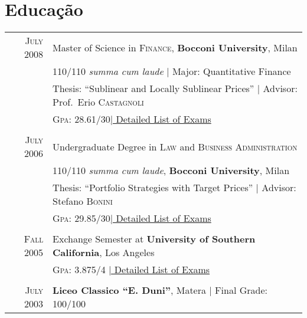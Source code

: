 \documentclass[a4paper,10pt]{article}
\begin{document}
\section{Educação}
\begin{tabular}{rl}	

  \textsc{July} 2008  & Master of Science in \textsc{Finance}, \textbf{Bocconi University}, Milan\\
                      & 110/110 \small\emph{summa cum laude} | Major: Quantitative Finance\\
                      & Thesis: ``Sublinear and Locally Sublinear Prices'' | \small Advisor: Prof.~Erio \textsc{Castagnoli}\\
                      &\normalsize \textsc{Gpa}: 28.61/30\hyperlink{grds}{\hfill | \footnotesize Detailed List of Exams}\\
                      
                      &\\

  \textsc{July} 2006  & Undergraduate Degree in \textsc{Law} and \textsc{Business Administration} \\
                      & 110/110 \small\emph{summa cum laude}, \normalsize\textbf{Bocconi University}, Milan\\
                      & Thesis: ``Portfolio Strategies with Target Prices'' | \small Advisor: Stefano \textsc{Bonini}\\
                      & \normalsize \textsc{Gpa}: 29.85/30\hyperlink{grds_cleli}{\hfill| \footnotesize Detailed List of Exams}\\
                      
                      &\\

  \textsc{Fall} 2005  & Exchange Semester at \textbf{University of Southern California}, Los Angeles\\
                      & \textsc{Gpa}: 3.875/4 \hyperlink{grds_usc}{\hfill| \footnotesize Detailed List of Exams}\\
                      
                      &\\

  \textsc{July} 2003  & \textbf{Liceo Classico ``E. Duni''}, Matera | Final Grade: 100/100

\end{tabular}
\end{document}
